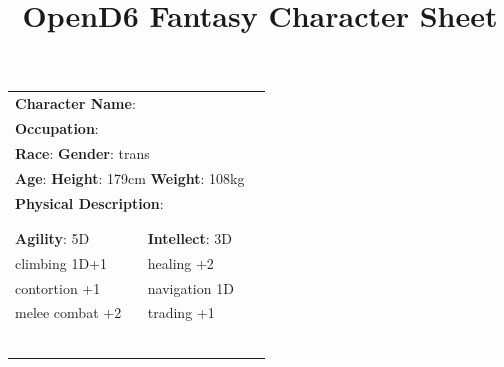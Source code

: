 \documentclass[10pt]{article}
\title{OpenD6 Fantasy Character Sheet}
\begin{document}
\pagestyle{fancy}
\fancyhf{}
\fancyfoot[R]{\thepage}
\renewcommand{\headrulewidth}{0pt}


\cleardoublepage
\begin{table}
\begin{tabular}{m{156pt} m{156pt} m{156pt}}
    \multicolumn{2}{l}{\textbf{Character Name}:  \hrulefill} \\
    \multicolumn{2}{l}{\textbf{Occupation}:  \hrulefill} \\
    \multicolumn{2}{l}{\textbf{Race}:  \hrulefill \hspace{1em} \textbf{Gender}: trans \hrulefill} \\
    \multicolumn{2}{l}{\textbf{Age}:  \hrulefill \hspace{1em} \textbf{Height}: 179cm \hrulefill \hspace{1em}  \textbf{Weight}: 108kg \hrulefill } \\
    \multicolumn{2}{l}{\textbf{Physical Description}:  \hrulefill } \\
    \multicolumn{2}{l}{ \hrulefill } \\
 & & \\
\textbf{Agility}: 5D \hrulefill      & \textbf{Intellect}: 3D \hrulefill  &                             \\

climbing        1D+1 \hrulefill & healing           +2 \hrulefill & \\

contortion        +1 \hrulefill & navigation        1D \hrulefill & \\

melee combat      +2 \hrulefill & trading           +1 \hrulefill & \\

 \hrulefill &  \hrulefill & \\

 \hrulefill &  \hrulefill & \\

 \hrulefill &  \hrulefill & \\

 \hrulefill &  \hrulefill & \\

 \hrulefill &  \hrulefill & \\

 \hrulefill &  \hrulefill & \\


\end{tabular}
\end{table}
\end{document}
